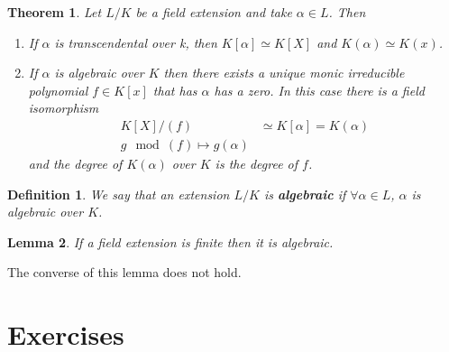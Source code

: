 \documentclass{article}
\newtheorem{theorem}{Theorem}[section]
\newtheorem{lemma}[theorem]{Lemma}
\newtheorem*{definition}{Definition}
\theoremstyle{remark}
\newenvironment{colbox}
    {\newcommand\colboxcolor{B6D0DE}%
    \begin{lrbox}{\selvestebox}%
    \begin{minipage}{\dimexpr\columnwidth-2\fboxsep\relax}}
    {\end{minipage}\end{lrbox}%
    \begin{center}
    \colorbox[HTML]{\colboxcolor}{\usebox{\selvestebox}}
    \end{center}}
\begin{document}
    \begin{colbox}
        \begin{theorem}
            Let $L/K$ be a field extension and take $\alpha\in L$. Then
            \begin{enumerate}
                \item If $\alpha$ is transcendental over k, then $K[\alpha]\simeq K[X]$ and $K(\alpha)\simeq K(x)$.
                \item If $\alpha$ is algebraic over $K$ then there exists a unique monic irreducible polynomial $f\in K[x]$ that has $\alpha$ has a zero.
                    In this case there is a field isomorphism
                    \begin{align*}
                        K[X]/(f)&\simeq K[\alpha]=K(\alpha)\\
                        g\mod (f)\mapsto g(\alpha)
                    \end{align*}
                    and the degree of $K(\alpha)$ over $K$ is the degree of $f$.
            \end{enumerate}
        \end{theorem}
    \end{colbox}

    \begin{definition}
        We say that an extension $L/K$ is \textbf{algebraic} if $\forall \alpha\in L$, $\alpha$ is algebraic over $K$.
    \end{definition}
    \begin{lemma}
        If a field extension is finite then it is algebraic.
    \end{lemma}
    The converse of this lemma does not hold.

    \newpage
    \section{Exercises}
    
\end{document}
